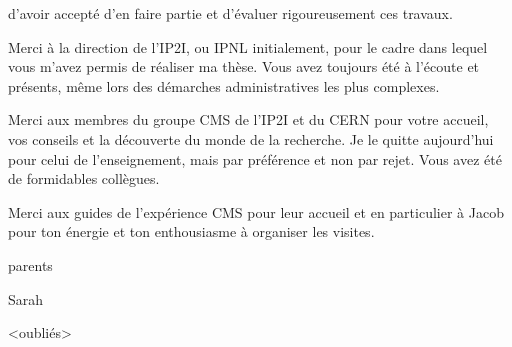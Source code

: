 d'avoir accepté d'en faire partie et d'évaluer rigoureusement ces travaux.
\par
Merci à la direction de l'IP2I, ou IPNL initialement,
pour le cadre dans lequel vous m'avez permis de réaliser ma thèse.
Vous avez toujours été à l'écoute et présents, même lors des démarches administratives les plus complexes.
\par
Merci aux membres du groupe CMS de l'IP2I et du CERN
pour votre accueil, vos conseils et la découverte du monde de la recherche.
Je le quitte aujourd'hui pour celui de l'enseignement,
mais par préférence et non par rejet.
Vous avez été de formidables collègues.
\par
Merci aux guides de l'expérience CMS pour leur accueil
et en particulier à Jacob pour ton énergie et ton enthousiasme
à organiser les visites.




parents

Sarah

<oubliés>
